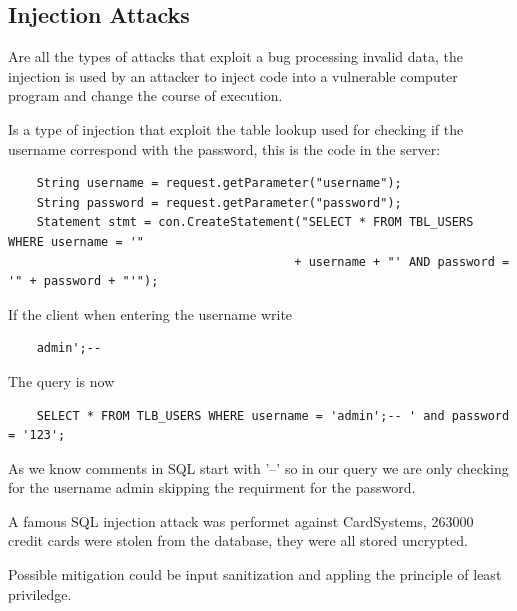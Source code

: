 \subsection{Injection Attacks}
Are all the types of attacks that exploit a bug processing invalid data, the injection is used by an attacker to inject code into a vulnerable computer program and change the course of execution.

Is a type of injection that exploit the table lookup used for checking if the username correspond with the password,
this is the code in the server:
\begin{verbatim}
    String username = request.getParameter("username");
    String password = request.getParameter("password");
    Statement stmt = con.CreateStatement("SELECT * FROM TBL_USERS WHERE username = '" 
                                        + username + "' AND password = '" + password + "'");
\end{verbatim}
If the client when entering the username write
\begin{verbatim}
    admin';--
\end{verbatim}
The query is now
\begin{verbatim}
    SELECT * FROM TLB_USERS WHERE username = 'admin';-- ' and password = '123';
\end{verbatim}
As we know comments in SQL start with '--' so in our query we are only checking for the username admin skipping the requirment for the password.

A famous SQL injection attack was performet against CardSystems, 263000 credit cards were stolen from the database, they were all stored uncrypted.

Possible mitigation could be input sanitization and appling the principle of least priviledge.

